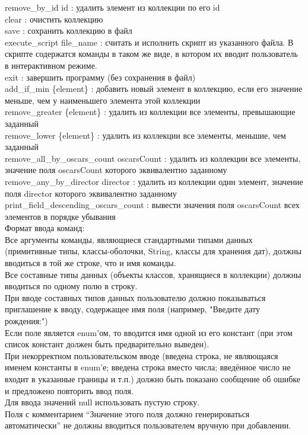 remove\_by\_id id : удалить элемент из коллекции по его id\\
clear : очистить коллекцию\\
save : сохранить коллекцию в файл\\
execute\_script file\_name : считать и исполнить скрипт из указанного файла. В скрипте содержатся команды в таком же виде, в котором их вводит пользователь в интерактивном режиме.\\
exit : завершить программу (без сохранения в файл)\\
add\_if\_min \{element\} : добавить новый элемент в коллекцию, если его значение меньше, чем у наименьшего элемента этой коллекции\\
remove\_greater \{element\} : удалить из коллекции все элементы, превышающие заданный\\
remove\_lower \{element\} : удалить из коллекции все элементы, меньшие, чем заданный\\
remove\_all\_by\_oscars\_count oscarsCount : удалить из коллекции все элементы, значение поля oscarsCount которого эквивалентно заданному\\
remove\_any\_by\_director director : удалить из коллекции один элемент, значение поля director которого эквивалентно заданному\\
print\_field\_descending\_oscars\_count : вывести значения поля oscarsCount всех элементов в порядке убывания\\
Формат ввода команд:\\
Все аргументы команды, являющиеся стандартными типами данных (примитивные типы, классы-оболочки, String, классы для хранения дат), должны вводиться в той же строке, что и имя команды.\\
Все составные типы данных (объекты классов, хранящиеся в коллекции) должны вводиться по одному полю в строку.\\
При вводе составных типов данных пользователю должно показываться приглашение к вводу, содержащее имя поля (например, "Введите дату рождения:")\\
Если поле является enum'ом, то вводится имя одной из его констант (при этом список констант должен быть предварительно выведен).\\
При некорректном пользовательском вводе (введена строка, не являющаяся именем константы в enum'е; введена строка вместо числа; введённое число не входит в указанные границы и т.п.) должно быть показано сообщение об ошибке и предложено повторить ввод поля.\\
Для ввода значений null использовать пустую строку.\\
Поля с комментарием ``Значение этого поля должно генерироваться автоматически'' не должны вводиться пользователем вручную при добавлении.\\

